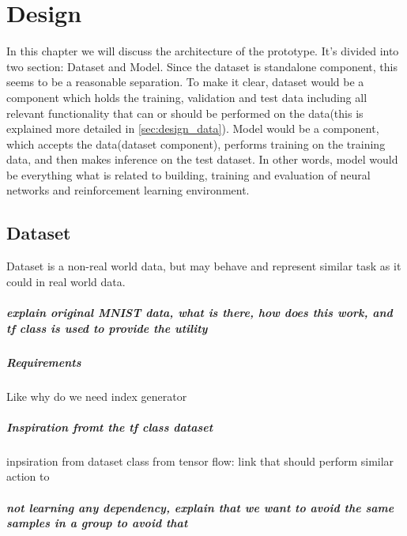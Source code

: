 \chapter{Design}
In this chapter we will discuss the architecture of the prototype.
It's divided into two section: Dataset and Model. Since
the dataset is standalone component, this seems to be
a reasonable separation. To make it clear, dataset would be a component
which holds the training, validation and test data including all relevant
functionality that can or should be performed on the
data(this is explained more detailed in \autoref{sec:design_data}).
Model would be a component, which accepts the data(dataset component), performs
training on the training data, and then makes inference on the test dataset.
In other words, model would be everything what is related to building,
training and evaluation of neural networks and reinforcement learning environment.



\section{Dataset}
\label{sec:design_data}
Dataset is a non-real world data, but may behave and represent similar
task as it could in real world data.
\paragraph{explain original MNIST data, what is there, how does this work,
and tf class is used to provide the utility}

\paragraph{Requirements} Like why do we need index generator

\paragraph{Inspiration fromt the tf class dataset}

inpsiration from dataset class from tensor flow: link
that should perform similar action to

\paragraph{
	not learning any dependency,
	explain that we want to avoid the same samples in a group to avoid that
}

